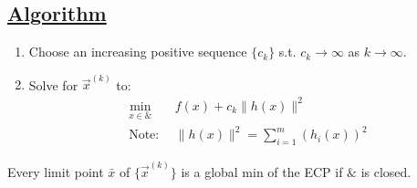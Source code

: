 \documentclass[11pt]{elegantbook}
\begin{document}
\subsection*{\underline{Algorithm}}
\begin{enumerate}[(1)]
    \item Choose an increasing positive sequence $\{c_k\}$ s.t. $c_k \rightarrow \infty$ as $k \rightarrow \infty$.
    \item Solve for $\vec{x}^{(k)}$ to:
    \begin{equation}
        \begin{aligned}
            \min_{x\in \&}\quad &f(x)+c_k\|h(x)\|^2\\
            \text{Note: } &\|h(x)\|^2=\sum_{i=1}^m(h_i(x))^2
        \end{aligned}
        \nonumber
    \end{equation}
\end{enumerate}
\begin{proposition}
    Every limit point $\bar{x}$ of $\{\vec{x}^{(k)}\}$ is a global min of the ECP if $\&$ is closed.
\end{proposition}
\end{document}
